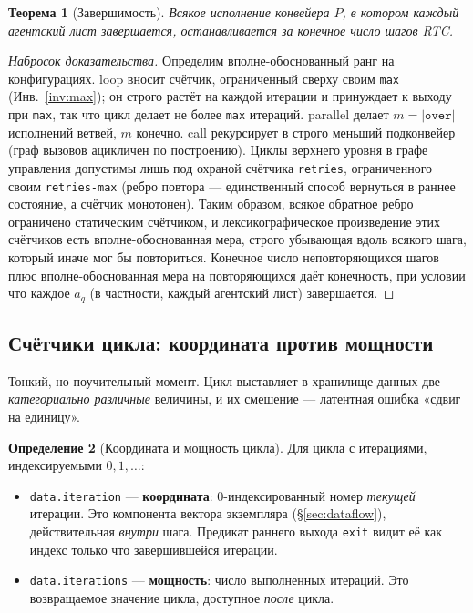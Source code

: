 \documentclass[11pt]{article}
\theoremstyle{plain}
\newtheorem{theorem}{Теорема}[section]
\theoremstyle{definition}
\newtheorem{definition}[theorem]{Определение}
\theoremstyle{remark}
\newcommand{\code}[1]{\texttt{#1}}
\newcommand{\state}[1]{\textsf{#1}}
\begin{document}
\begin{theorem}[Завершимость]\label{thm:termination}
Всякое исполнение конвейера $P$, в котором каждый агентский лист завершается,
останавливается за конечное число шагов RTC.
\end{theorem}

\begin{proof}[Набросок доказательства]
Определим вполне-обоснованный ранг на конфигурациях. \state{loop} вносит счётчик,
ограниченный сверху своим \code{max} (Инв.~\ref{inv:max}); он строго растёт на каждой
итерации и принуждает к выходу при \code{max}, так что цикл делает не более \code{max}
итераций. \state{parallel} делает $m = |\code{over}|$ исполнений ветвей, $m$ конечно.
\state{call} рекурсирует в строго меньший подконвейер (граф вызовов ацикличен по
построению). Циклы верхнего уровня в графе управления допустимы лишь под охраной счётчика
\code{retries}, ограниченного своим \code{retries-max} (ребро повтора --- единственный
способ вернуться в раннее состояние, а счётчик монотонен). Таким образом, всякое обратное
ребро ограничено статическим счётчиком, и лексикографическое произведение этих счётчиков
есть вполне-обоснованная мера, строго убывающая вдоль всякого шага, который иначе мог бы
повториться. Конечное число неповторяющихся шагов плюс вполне-обоснованная мера на
повторяющихся даёт конечность, при условии что каждое $a_q$ (в частности, каждый
агентский лист) завершается.
\end{proof}

\subsection{Счётчики цикла: координата против мощности}\label{sec:loopcounters}

Тонкий, но поучительный момент. Цикл выставляет в хранилище данных две
\emph{категориально различные} величины, и их смешение --- латентная ошибка
«сдвиг на единицу».

\begin{definition}[Координата и мощность цикла]
Для цикла с итерациями, индексируемыми $0,1,\dots$:
\begin{itemize}[nosep]
  \item \code{data.iteration} --- \textbf{координата}: $0$-индексированный номер
        \emph{текущей} итерации. Это компонента вектора экземпляра
        (\S\ref{sec:dataflow}), действительная \emph{внутри} шага. Предикат раннего
        выхода \code{exit} видит её как индекс только что завершившейся итерации.
  \item \code{data.iterations} --- \textbf{мощность}: число выполненных итераций. Это
        возвращаемое значение цикла, доступное \emph{после} цикла.
\end{itemize}
\end{definition}
\end{document}
